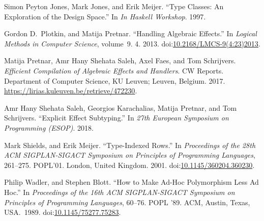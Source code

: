 \documentclass{llncs}
\begin{document}
{\begin{thebibliography}{20}
\mdbibitemlabel{{}[13]}Simon Peyton Jones, Mark Jones, and Erik Meijer. \textquotedblleft{}Type Classes: An Exploration of the Design Space.\textquotedblright{} In \emph{In Haskell Workshop}. 1997.%

\mdbibitemlabel{{}[14]}Gordon D.~Plotkin, and Matija Pretnar. \textquotedblleft{}Handling Algebraic Effects.\textquotedblright{} In \emph{Logical Methods in Computer Science}, volume 9. 4. 2013. doi:\href{https://dx.doi.org/10.2168/LMCS-9\%25284:23\%25292013}{10.2168/LMCS-9(4:23)2013}.%

\mdbibitemlabel{{}[15]}Matija Pretnar, Amr Hany Shehata Saleh, Axel Faes, and Tom Schrijvers. \emph{Efficient Compilation of Algebraic Effects and Handlers}. CW Reports. Department of Computer Science, KU Leuven; Leuven, Belgium. 2017. \href{https://lirias.kuleuven.be/retrieve/472230}{{\ttfamily https://\hspace{0pt}lirias.\hspace{0pt}kuleuven.\hspace{0pt}be/\hspace{0pt}retrieve/\hspace{0pt}472230}}.%

\mdbibitemlabel{{}[16]}Amr Hany Shehata Saleh, Georgios Karachalias, Matija Pretnar, and Tom Schrijvers. \textquotedblleft{}Explicit Effect Subtyping.\textquotedblright{} In \emph{27th European Symposium on Programming (ESOP)}. 2018.%

\mdbibitemlabel{{}[17]}Mark Shields, and Erik Meijer. \textquotedblleft{}Type-Indexed Rows.\textquotedblright{} In \emph{Proceedings of the 28th ACM SIGPLAN-SIGACT Symposium on Principles of Programming Languages}, 261–275. POPL’01. London, United Kingdom. 2001. doi:\href{https://dx.doi.org/10.1145/360204.360230}{10.1145/360204.360230}.%

\mdbibitemlabel{{}[18]}Philip Wadler, and Stephen Blott. \textquotedblleft{}How to Make Ad-Hoc Polymorphism Less Ad Hoc.\textquotedblright{} In \emph{Proceedings of the 16th ACM SIGPLAN-SIGACT Symposium on Principles of Programming Languages}, 60–76. POPL ’89. ACM, Austin, Texas, USA.~1989. doi:\href{https://dx.doi.org/10.1145/75277.75283}{10.1145/75277.75283}.%


\end{thebibliography}}
\end{document}
